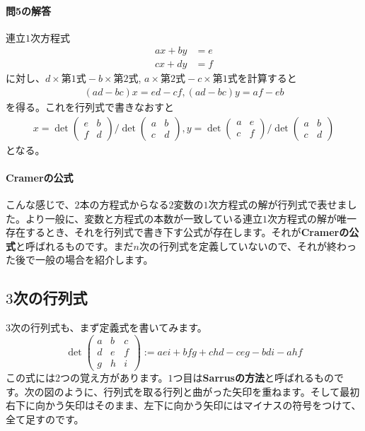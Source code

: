 \paragraph{問5の解答} 連立$1$次方程式
\begin{align*}
ax + by &= e \\
cx + dy &= f
\end{align*}
に対し、$d\times\text{第1式} - b\times\text{第2式}$, $a\times\text{第2式} - c\times\text{第1式}$を計算すると
\begin{align*}
(ad - bc)x = ed - cf, (ad - bc)y = af - eb
\end{align*}
を得る。これを行列式で書きなおすと
\begin{align*}
x = 
\det
\begin{pmatrix}
e & b \\
f & d
\end{pmatrix}
/
\det
\begin{pmatrix}
a & b \\
c & d
\end{pmatrix}, 
y =
\det
\begin{pmatrix}
a & e \\
c & f
\end{pmatrix}
/
\det
\begin{pmatrix}
a & b \\
c & d
\end{pmatrix}
\end{align*}
となる。

\paragraph{Cramerの公式} こんな感じで、$2$本の方程式からなる$2$変数の$1$次方程式の解が行列式で表せました。より一般に、変数と方程式の本数が一致している連立$1$次方程式の解が唯一存在するとき、それを行列式で書き下す公式が存在します。それが\textbf{Cramerの公式}と呼ばれるものです。まだ$n$次の行列式を定義していないので、それが終わった後で一般の場合を紹介します。

\subsection{$3$次の行列式}

$3$次の行列式も、まず定義式を書いてみます。
\[
\det
\begin{pmatrix}
a & b & c \\
d & e & f \\
g & h & i
\end{pmatrix}
:=  aei + bfg + chd - ceg - bdi - ahf
\]
この式には$2$つの覚え方があります。$1$つ目は\textbf{Sarrusの方法}と呼ばれるものです。次の図のように、行列式を取る行列と曲がった矢印を重ねます。そして最初右下に向かう矢印はそのまま、左下に向かう矢印にはマイナスの符号をつけて、全て足すのです。

